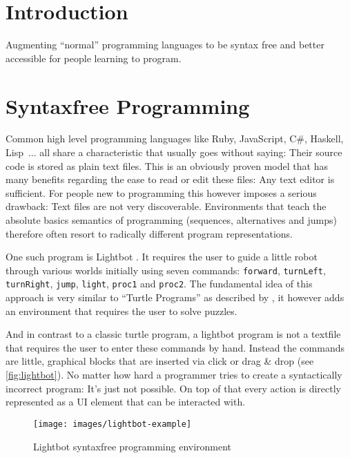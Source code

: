 \section{Introduction}
\label{sec:introduction}

Augmenting \enquote{normal} programming languages to be syntax free and better accessible for people learning to program.

\section{Syntaxfree Programming}
\label{sec:syntaxfree-programming}

Common high level programming languages like Ruby, JavaScript, C\#, Haskell, Lisp~... all share a characteristic that usually goes without saying: Their source code is stored as plain text files. This is an obviously proven model that has many benefits regarding the ease to read or edit these files: Any text editor is sufficient. For people new to programming this however imposes a serious drawback: Text files are not very discoverable. Environments that teach the absolute basics semantics of programming (sequences, alternatives and jumps) therefore often resort to radically different program representations.

One such program is Lightbot \cite{yaroslavski_lightbot}. It requires the user to guide a little robot through various worlds initially using seven commands: \texttt{forward}, \texttt{turnLeft}, \texttt{turnRight}, \texttt{jump}, \texttt{light}, \texttt{proc1} and \texttt{proc2}. The fundamental idea of this approach is very similar to \enquote{Turtle Programs} as described by \cite{papert_mindstorms_1982}, it however adds an environment that requires the user to solve puzzles.

And in contrast to a classic turtle program, a lightbot program is not a textfile that requires the user to enter these commands by hand. Instead the commands are little, graphical blocks that are inserted via click or drag \& drop (see \autoref{fig:lightbot}). No matter how hard a programmer tries to create a syntactically incorrect program: It's just not possible. On top of that every action is directly represented as a UI element that can be interacted with.

\begin{figure}
  \texttt{[image: images/lightbot-example]}
  \caption{Lightbot syntaxfree programming environment}
  \label{fig:lightbot}
\end{figure}

